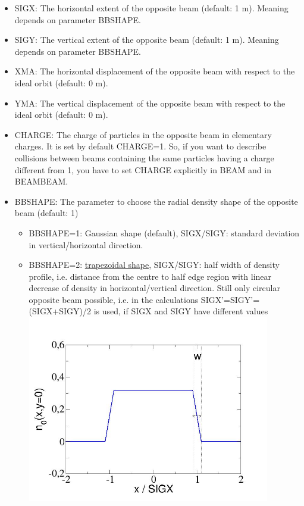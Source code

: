 \begin{itemize}
   \item SIGX:
     The horizontal extent of the opposite beam (default: 1 m).
     Meaning depends on parameter BBSHAPE.
   \item SIGY:
     The vertical extent of the opposite beam (default: 1 m).
     Meaning depends on parameter BBSHAPE.
   \item XMA:
     The horizontal displacement of the opposite beam with respect to
     the ideal orbit (default: 0 m).
   \item YMA:
     The vertical displacement of the opposite beam with respect to
     the ideal orbit (default: 0 m).
   \item CHARGE:
     The charge of particles in the opposite beam in elementary charges. 
     It is set by default CHARGE=1. So, if you want to describe collisions 
     between beams containing the same particles having a charge different 
     from 1, you have to set CHARGE explicitly in BEAM and 
     in BEAMBEAM. 
   \item BBSHAPE: The parameter to choose the radial density shape of the 
     opposite beam (default: 1)
     \begin{itemize}
       \item  BBSHAPE=1: Gaussian shape (default), SIGX/SIGY: standard deviation in 
         vertical/horizontal direction.
	\item  BBSHAPE=2: \href{beambeam_n_trapez.jpg}{trapezoidal shape}, 
          SIGX/SIGY: half width of density profile,
          i.e. distance from the centre to half edge region with linear decrease of 
          density in horizontal/vertical direction. Still only circular opposite beam 
          possible, i.e. in the calculations 
          SIGX'=SIGY'=(SIGX+SIGY)/2 is used, if SIGX and SIGY have
          different values 
\\
\includegraphics[width=400px]{Introduction/beambeam_n_trapez.jpg}%

\end{itemize}
\end{itemize}
